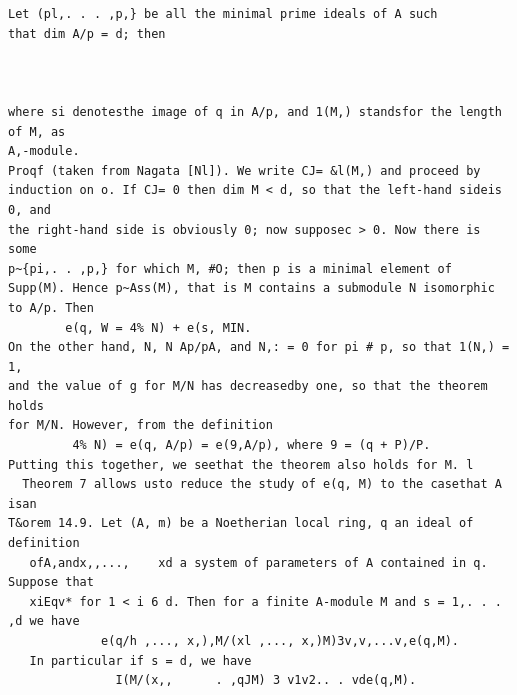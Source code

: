 \begin{theorem}\label{mcrt-auto-theorem-14-7}\uses{}
\begin{verbatim}
Let (pl,. . . ,p,} be all the minimal prime ideals of A such
that dim A/p = d; then



where si denotesthe image of q in A/p, and 1(M,) standsfor the length of M, as
A,-module.
Proqf (taken from Nagata [Nl]). We write CJ= &l(M,) and proceed by
induction on o. If CJ= 0 then dim M < d, so that the left-hand sideis 0, and
the right-hand side is obviously 0; now supposec > 0. Now there is some
p~{pi,. . ,p,} for which M, #O; then p is a minimal element of
Supp(M). Hence p~Ass(M), that is M contains a submodule N isomorphic
to A/p. Then
        e(q, W = 4% N) + e(s, MIN.
On the other hand, N, N Ap/pA, and N,: = 0 for pi # p, so that 1(N,) = 1,
and the value of g for M/N has decreasedby one, so that the theorem holds
for M/N. However, from the definition
         4% N) = e(q, A/p) = e(9,A/p), where 9 = (q + P)/P.
Putting this together, we seethat the theorem also holds for M. l
  Theorem 7 allows usto reduce the study of e(q, M) to the casethat A isan
T&orem 14.9. Let (A, m) be a Noetherian local ring, q an ideal of definition
   ofA,andx,,...,    xd a system of parameters of A contained in q. Suppose that
   xiEqv* for 1 < i 6 d. Then for a finite A-module M and s = 1,. . . ,d we have
             e(q/h ,..., x,),M/(xl ,..., x,)M)3v,v,...v,e(q,M).
   In particular if s = d, we have
               I(M/(x,,      . ,qJM) 3 v1v2.. . vde(q,M).
\end{verbatim}
\end{theorem}
